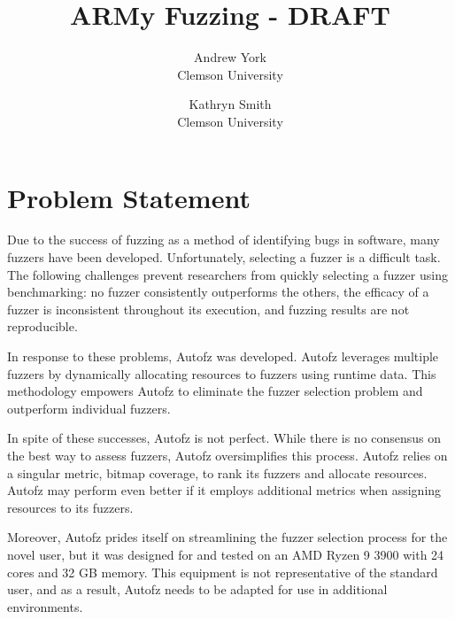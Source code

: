 
\graphicspath{ {./images/} }

\date{}

\title{\Large \bf ARMy Fuzzing - DRAFT}

\author{
{\rm Andrew York}\\
Clemson University
\and
{\rm Kathryn Smith}\\
Clemson University
} %

\maketitle

\section{Problem Statement}

Due to the success of fuzzing as a method of identifying bugs in software, many fuzzers have been 
developed. Unfortunately, selecting a fuzzer is a difficult task. The following challenges prevent 
researchers from quickly selecting a fuzzer using benchmarking: no fuzzer consistently outperforms 
the others, the efficacy of a fuzzer is inconsistent throughout its execution, and fuzzing results 
are not reproducible.

In response to these problems, Autofz was developed. Autofz leverages multiple fuzzers by dynamically 
allocating resources to fuzzers using runtime data. This methodology empowers Autofz to eliminate the 
fuzzer selection problem and outperform individual fuzzers.

In spite of these successes, Autofz is not perfect. While there is no consensus on the best way to 
assess fuzzers, Autofz oversimplifies this process. Autofz relies on a singular metric, bitmap 
coverage, to rank its fuzzers and allocate resources. Autofz may perform even better if it employs 
additional metrics when assigning resources to its fuzzers.

Moreover, Autofz prides itself on streamlining the fuzzer selection process for the novel user, but 
it was designed for and tested on an AMD Ryzen 9 3900 with 24 cores and 32 GB memory. This equipment 
is not representative of the standard user, and as a result, Autofz needs to be adapted for use in 
additional environments. \cite{Fu}

